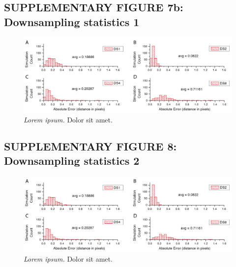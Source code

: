 \documentclass[]{spie}  %
\begin{document}
\pagebreak

\subsection*{SUPPLEMENTARY FIGURE 7b: Downsampling statistics 1}
\vspace{1mm}
\begin{figure}[h!]
\includegraphics[width=\textwidth]{fig-downsampling-statistics-1.png}
\vspace{-2.0mm}
\caption{\hspace{-0.5mm} \emph{Lorem ipsum.} Dolor sit amet.
}
\label{fig:sup-fig-downsampling-statistics-1}
\end{figure}

\pagebreak

\subsection*{SUPPLEMENTARY FIGURE 8: Downsampling statistics 2}
\vspace{1mm}
\begin{figure}[h!]
\includegraphics[width=\textwidth]{fig-downsampling-statistics-1.png}
\vspace{-2.0mm}
\caption{\hspace{-0.5mm} \emph{Lorem ipsum.} Dolor sit amet.
}
\label{fig:sup-fig-downsampling-statistics-2}
\end{figure}

\pagebreak
\end{document}
